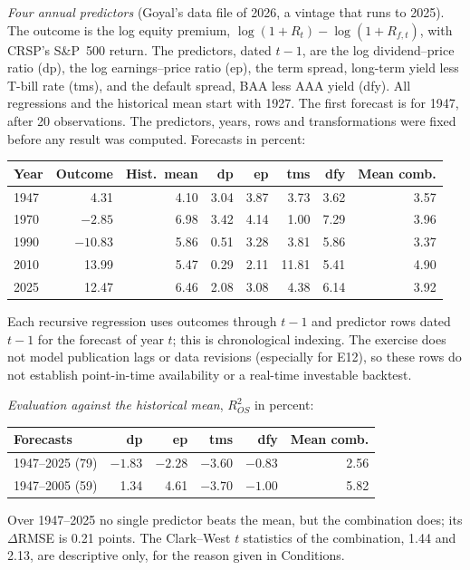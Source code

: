 \begin{qfmethod}
 \emph{Four annual predictors} (Goyal's data file of 2026, a vintage that runs to 2025). The outcome is the log equity premium, $\log(1+R_t)-\log(1+R_{f,t})$, with CRSP's S\&P~500 return. The predictors, dated $t-1$, are the log dividend--price ratio (dp), the log earnings--price ratio (ep), the term spread, long-term yield less T-bill rate (tms), and the default spread, BAA less AAA yield (dfy). All regressions and the historical mean start with 1927. The first forecast is for 1947, after 20 observations. The predictors, years, rows and transformations were fixed before any result was computed. Forecasts in percent:
\begin{center}\small
\begin{tabular}{@{}lrrrrrrr@{}}
\toprule
Year & Outcome & Hist.\ mean & dp & ep & tms & dfy & Mean comb. \\
\midrule
1947 & 4.31 & 4.10 & 3.04 & 3.87 & 3.73 & 3.62 & 3.57 \\
1970 & $-2.85$ & 6.98 & 3.42 & 4.14 & 1.00 & 7.29 & 3.96 \\
1990 & $-10.83$ & 5.86 & 0.51 & 3.28 & 3.81 & 5.86 & 3.37 \\
2010 & 13.99 & 5.47 & 0.29 & 2.11 & 11.81 & 5.41 & 4.90 \\
2025 & 12.47 & 6.46 & 2.08 & 3.08 & 4.38 & 6.14 & 3.92 \\
\bottomrule
\end{tabular}
\end{center}
Each recursive regression uses outcomes through $t-1$ and predictor rows dated $t-1$ for the forecast of year $t$; this is chronological indexing. The exercise does not model publication lags or data revisions (especially for E12), so these rows do not establish point-in-time availability or a real-time investable backtest.

\emph{Evaluation against the historical mean}, $R^2_{OS}$ in percent:
\begin{center}\small
\begin{tabular}{@{}lrrrrr@{}}
\toprule
Forecasts & dp & ep & tms & dfy & Mean comb. \\
\midrule
1947--2025 (79) & $-1.83$ & $-2.28$ & $-3.60$ & $-0.83$ & 2.56 \\
1947--2005 (59) & 1.34 & 4.61 & $-3.70$ & $-1.00$ & 5.82 \\
\bottomrule
\end{tabular}
\end{center}
Over 1947--2025 no single predictor beats the mean, but the combination does; its $\Delta$RMSE is 0.21 points. The Clark--West $t$ statistics of the combination, 1.44 and 2.13, are descriptive only, for the reason given in Conditions.


\end{qfmethod}
